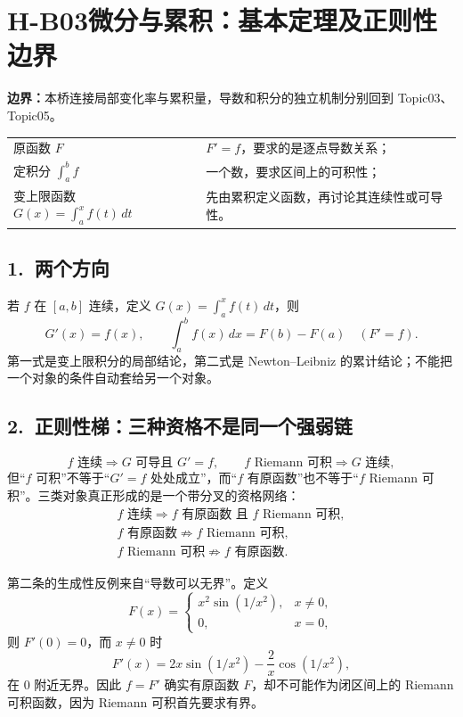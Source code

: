 \documentclass[UTF8,a4paper,10pt]{ctexart}
\begin{document}
\section*{H-B03\quad 微分与累积：基本定理及正则性边界}
\textbf{边界：}本桥连接局部变化率与累积量，导数和积分的独立机制分别回到 Topic03、Topic05。
\begin{tcolorbox}[title=三类对象必须分开]
\begin{tabularx}{\linewidth}{@{}lX@{}}
原函数 $F$ & $F'=f$，要求的是逐点导数关系；\\
定积分 $\int_a^b f$ & 一个数，要求区间上的可积性；\\
变上限函数 $G(x)=\int_a^x f(t)\,dt$ & 先由累积定义函数，再讨论其连续性或可导性。
\end{tabularx}
\end{tcolorbox}
\subsection*{1.\ 两个方向}
若 $f$ 在 $[a,b]$ 连续，定义 $G(x)=\int_a^x f(t)\,dt$，则
\[
G'(x)=f(x),\qquad \int_a^b f(x)\,dx=F(b)-F(a)\quad(F'=f).
\]
第一式是变上限积分的局部结论，第二式是 Newton--Leibniz 的累计结论；不能把一个对象的条件自动套给另一个对象。
\subsection*{2.\ 正则性梯：三种资格不是同一个强弱链}
\[
f\text{ 连续}\Rightarrow G\text{ 可导且 }G'=f,\qquad
f\text{ Riemann 可积}\Rightarrow G\text{ 连续},
\]
但“$f$ 可积”不等于“$G'=f$ 处处成立”，而“$f$ 有原函数”也不等于“$f$ Riemann 可积”。三类对象真正形成的是一个带分叉的资格网络：
\[
\boxed{\begin{array}{c}
f\text{ 连续}\Longrightarrow f\text{ 有原函数}\text{ 且 }f\text{ Riemann 可积},\\[2mm]
f\text{ 有原函数}\not\Longrightarrow f\text{ Riemann 可积},\\
f\text{ Riemann 可积}\not\Longrightarrow f\text{ 有原函数}.
\end{array}}
\]

第二条的生成性反例来自“导数可以无界”。定义
\[
F(x)=\begin{cases}
x^2\sin(1/x^2),&x\ne0,\\
0,&x=0,
\end{cases}
\]
则 $F'(0)=0$，而 $x\ne0$ 时
\[
F'(x)=2x\sin(1/x^2)-\frac{2}{x}\cos(1/x^2),
\]
在 $0$ 附近无界。因此 $f=F'$ 确实有原函数 $F$，却不可能作为闭区间上的 Riemann 可积函数，因为 Riemann 可积首先要求有界。
\end{document}
